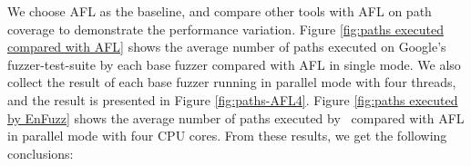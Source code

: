 We choose AFL as the baseline, and compare other tools with AFL on path coverage to demonstrate the performance variation. 
Figure \ref{fig:paths executed compared with AFL} shows the average number of paths executed on Google's fuzzer-test-suite by each base fuzzer compared with AFL in single mode.
We also collect the result of each base fuzzer running in parallel mode with four threads, 
and the result is presented in Figure \ref{fig:paths-AFL4}.
Figure \ref{fig:paths executed by EnFuzz} shows the average number of paths executed by \EnFuzz ~compared with AFL in parallel mode with four CPU cores.
From these results, we get the following conclusions:
